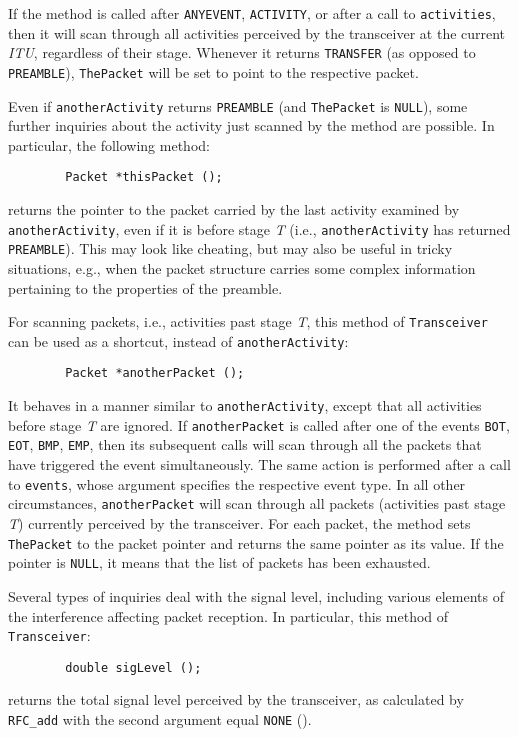 If the method is called after {\tt ANYEVENT}, {\tt ACTIVITY}, or after
a call to {\tt activities}, then it will scan through
all activities perceived by the transceiver at the current {\em ITU},
regardless of their stage.
Whenever it returns {\tt TRANSFER} (as opposed to {\tt PREAMBLE}),
{\tt ThePacket} will be set to point to the respective packet.

Even if {\tt anotherActivity} returns {\tt PREAMBLE} (and
{\tt ThePacket} is {\tt NULL}),
some further inquiries about the activity just scanned by the
method are possible.
In particular, the following method:
\begin{verbatim}
        Packet *thisPacket ();
\end{verbatim}
\noindent
returns the pointer to the packet carried by the last activity examined
by {\tt anotherActivity}, even if it is before stage {\em T\/} (i.e.,
{\tt anotherActivity} has returned {\tt PREAMBLE}).
This may look like cheating, but may also be useful in tricky situations,
e.g., when the
packet structure carries some complex information pertaining to the properties
of the preamble.

For scanning packets, i.e., activities past stage {\em T}, this method of
{\tt Transceiver} can be
used as a shortcut, instead of {\tt anotherActivity}:
\begin{verbatim}
        Packet *anotherPacket ();
\end{verbatim}
It behaves in a manner similar to {\tt anotherActivity}, except that all
activities before stage {\em T\/} are ignored.
If {\tt anotherPacket} is called after one of the events
{\tt BOT}, {\tt EOT}, {\tt BMP}, {\tt EMP},
then its subsequent calls will scan through all the packets that have
triggered the event simultaneously.
The same action is performed after a call to {\tt events}, whose argument
specifies the respective event type.
In all other circumstances, {\tt anotherPacket} will scan through all packets
(activities past stage {\em T\/}) currently perceived by the
transceiver.
For each packet, the method sets {\tt ThePacket} to the packet pointer and
returns the same pointer as its value.
If the pointer is {\tt NULL}, it means that the list of
packets has been exhausted.

Several types of inquiries deal with the signal level, including various
elements of the interference affecting packet reception.
In particular, this method of {\tt Transceiver}:
\begin{verbatim}
        double sigLevel ();
\end{verbatim}
\noindent
returns the total signal level perceived by the transceiver, as calculated
by {\tt RFC\_add} with the second argument equal {\tt NONE}
().

